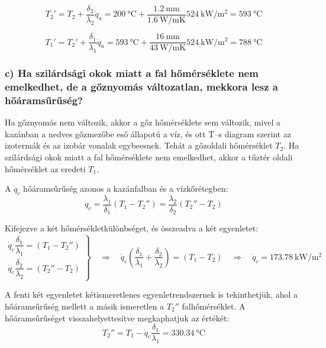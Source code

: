 \begin{equation}
	T_2' = T_2 + \frac{\delta_2}{\lambda_2}\dot{q}_a = \SI{200}{\celsius} + \frac{\SI{1.2}{\milli\meter}}{\SI{1.6}{\watt\per\meter\kelvin}} \SI{524}{\kilo\watt\per\meter\squared} = \SI{593}{\celsius}
\end{equation}

\begin{equation}
	T_1' = T_2' + \frac{\delta_1}{\lambda_1}\dot{q}_a = \SI{593}{\celsius} + \frac{\SI{16}{\milli\meter}}{\SI{43}{\watt\per\meter\kelvin}} \SI{524}{\kilo\watt\per\meter\squared} = \SI{788}{\celsius}
\end{equation}

\subsubsection*{c) Ha szilárdsági okok miatt a fal hőmérséklete nem emelkedhet, de a gőznyomás változatlan, mekkora lesz a hőáramsűrűség?}

Ha gőznyomás nem változik, akkor a gőz hőmérséklete sem változik, mivel a kazánban a nedves gőzmezőbe eső állapotú a víz, és ott T--s diagram szerint az izotermák és az izobár vonalak egybeesnek. Tehát a gőzoldali hőmérséklet $T_2$. Ha szilárdsági okok miatt a fal hőmérséklete nem emelkedhet, akkor a tűztér oldali hőmérséklet az eredeti $T_1$.

A $\dot{q}_c$ hőáramsűrűség azonos a kazánfalban és a vízkőrétegben:
\begin{equation}
	\dot{q}_c = \frac{\lambda_1}{\delta_1} (T_1 - T_2'') = \frac{\lambda_2}{\delta_2} (T_2'' - T_2)
\end{equation}

Kifejezve a két hőmérsékletkülönbséget, és összeadva a két egyenletet:
\begin{equation}
	\left.
	\begin{array}{lcl}
		\dot{q}_c \dfrac{\delta_1}{\lambda_1} = (T_1 - T_2'') \\
		\dot{q}_c \dfrac{\delta_2}{\lambda_2} = (T_2'' - T_2)
	\end{array}
	\right\rbrace
	\quad \Rightarrow \quad 
	\dot{q}_c \left(\dfrac{\delta_1}{\lambda_1} + \dfrac{\delta_2}{\lambda_2} \right) = (T_1 - T_2) 
	\quad \Rightarrow \quad 
	\dot{q}_c = 
	\SI{173.78}{\kilo\watt\per\meter\squared}
\end{equation}

A fenti két egyenletet kétismeretlenes egyenletrendszernek is tekinthetjük, ahol a hőáramsűrűség mellett a másik ismeretlen a $T_2''$ falhőmérséklet. A hőáramsűrűséget visszahelyettesítve megkaphatjuk az értékét:
\begin{equation}
	T_2'' = T_1 - \dot{q}_c \dfrac{\delta_1}{\lambda_1} = \SI{330.34}{\celsius}
\end{equation}

\pagebreak
